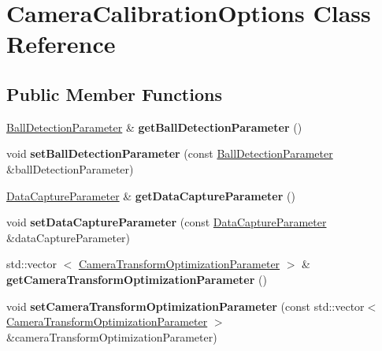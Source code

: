 \hypertarget{classCameraCalibrationOptions}{\section{\-Camera\-Calibration\-Options \-Class \-Reference}
\label{classCameraCalibrationOptions}
}
\subsection*{\-Public \-Member \-Functions}
\begin{DoxyCompactItemize}
\item 
\hypertarget{classCameraCalibrationOptions_a625eff0db9f89abe9007e5ea7937d701}{\hyperlink{classBallDetectionParameter}{\-Ball\-Detection\-Parameter} \& {\bfseries get\-Ball\-Detection\-Parameter} ()}\label{classCameraCalibrationOptions_a625eff0db9f89abe9007e5ea7937d701}

\item 
\hypertarget{classCameraCalibrationOptions_a995130e8d921df7698903c295bbf8329}{void {\bfseries set\-Ball\-Detection\-Parameter} (const \hyperlink{classBallDetectionParameter}{\-Ball\-Detection\-Parameter} \&ball\-Detection\-Parameter)}\label{classCameraCalibrationOptions_a995130e8d921df7698903c295bbf8329}

\item 
\hypertarget{classCameraCalibrationOptions_a8d75416c4ff7f9b5d9dfc5d2bd75a39c}{\hyperlink{classDataCaptureParameter}{\-Data\-Capture\-Parameter} \& {\bfseries get\-Data\-Capture\-Parameter} ()}\label{classCameraCalibrationOptions_a8d75416c4ff7f9b5d9dfc5d2bd75a39c}

\item 
\hypertarget{classCameraCalibrationOptions_a553eae8fe71c597667e6055934dd4563}{void {\bfseries set\-Data\-Capture\-Parameter} (const \hyperlink{classDataCaptureParameter}{\-Data\-Capture\-Parameter} \&data\-Capture\-Parameter)}\label{classCameraCalibrationOptions_a553eae8fe71c597667e6055934dd4563}

\item 
\hypertarget{classCameraCalibrationOptions_a9a4406fd58f084f47d77d69c086f71ec}{std\-::vector\*
$<$ \hyperlink{classCameraTransformOptimizationParameter}{\-Camera\-Transform\-Optimization\-Parameter} $>$ \& {\bfseries get\-Camera\-Transform\-Optimization\-Parameter} ()}\label{classCameraCalibrationOptions_a9a4406fd58f084f47d77d69c086f71ec}

\item 
\hypertarget{classCameraCalibrationOptions_a487780fc6c9b0425411c21fcb084a464}{void {\bfseries set\-Camera\-Transform\-Optimization\-Parameter} (const std\-::vector$<$ \hyperlink{classCameraTransformOptimizationParameter}{\-Camera\-Transform\-Optimization\-Parameter} $>$ \&camera\-Transform\-Optimization\-Parameter)}\label{classCameraCalibrationOptions_a487780fc6c9b0425411c21fcb084a464}

\end{DoxyCompactItemize}

